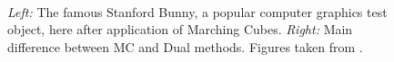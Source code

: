 \begin{figure}
\centering
   \\
   \caption{\textit{Left:} The famous Stanford Bunny, a popular computer graphics test object, here after application of Marching Cubes. \textit{Right:} Main difference between MC and Dual methods.  Figures taken from \cite{Hermite2002}. }
   \label{fig:bunny_MCDC}
\end{figure}



